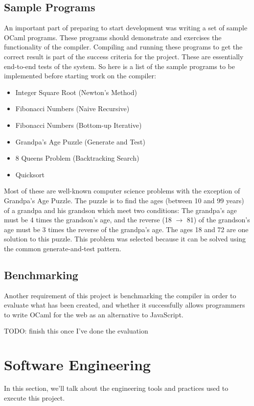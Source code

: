 \documentclass[12pt,a4paper,twoside,openright]{report}
\begin{document}
\subsection{Sample Programs}
An important part of preparing to start development was writing a set of sample OCaml programs.
These programs should demonstrate and exercises the functionality of the compiler.
Compiling and running these programs to get the correct result is part of the success criteria for the project.
These are essentially end-to-end tests of the system.
So here is a list of the sample programs to be implemented before starting work on the compiler:
\begin{itemize}
   \item Integer Square Root (Newton's Method)
   \item Fibonacci Numbers (Naive Recursive)
   \item Fibonacci Numbers (Bottom-up Iterative)
   \item Grandpa's Age Puzzle (Generate and Test)
   \item 8 Queens Problem (Backtracking Search)
   \item Quicksort
\end{itemize}
Most of these are well-known computer science problems with the exception of Grandpa's Age Puzzle.
The puzzle is to find the ages (between 10 and 99 years) of a grandpa and his grandson which meet two conditions: The grandpa's age must be 4 times the grandson's age, and the reverse (18 $\rightarrow$ 81) of the grandson's age must be 3 times the reverse of the grandpa's age.
The ages 18 and 72 are one solution to this puzzle.
This problem was selected because it can be solved using the common generate-and-test pattern.

\subsection{Benchmarking}
Another requirement of this project is benchmarking the compiler in order to evaluate what has been created, and whether it successfully allows programmers to write OCaml for the web as an alternative to JavaScript.

TODO: finish this once I've done the evaluation

\section{Software Engineering}
In this section, we'll talk about the engineering tools and practices used to execute this project.
\end{document}
